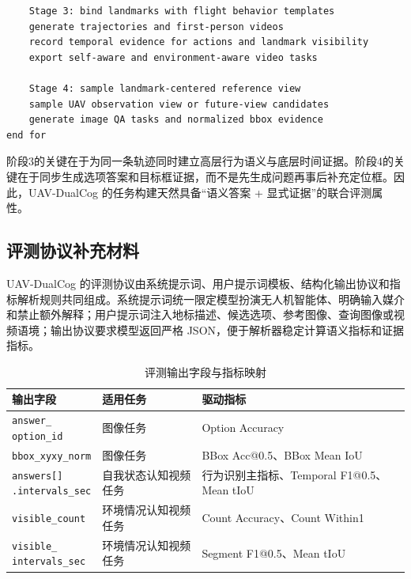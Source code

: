 \begin{thesisappendix}
\begin{verbatim}
    Stage 3: bind landmarks with flight behavior templates
    generate trajectories and first-person videos
    record temporal evidence for actions and landmark visibility
    export self-aware and environment-aware video tasks

    Stage 4: sample landmark-centered reference view
    sample UAV observation view or future-view candidates
    generate image QA tasks and normalized bbox evidence
end for
\end{verbatim}

阶段3的关键在于为同一条轨迹同时建立高层行为语义与底层时间证据。阶段4的关键在于同步生成选项答案和目标框证据，而不是先生成问题再事后补充定位框。因此，UAV-DualCog 的任务构建天然具备“语义答案 + 显式证据”的联合评测属性。
\end{thesisappendix}

\begin{thesisappendix}
\section{评测协议补充材料}
\label{app:evaluation-protocol}
\label{app:prompt-protocol}

UAV-DualCog 的评测协议由系统提示词、用户提示词模板、结构化输出协议和指标解析规则共同组成。系统提示词统一限定模型扮演无人机智能体、明确输入媒介和禁止额外解释；用户提示词注入地标描述、候选选项、参考图像、查询图像或视频语境；输出协议要求模型返回严格 JSON，便于解析器稳定计算语义指标和证据指标。

\begin{table}[htbp]
    \centering
    \caption{评测输出字段与指标映射}
    \label{tab:app-output-metric-map}
    \footnotesize
    \begin{tabularx}{\textwidth}{@{}p{3.0cm}p{3.4cm}X@{}}
        \toprule
        输出字段 & 适用任务 & 驱动指标 \\
        \midrule
        \makecell[l]{\texttt{answer\_}\\\texttt{option\_id}} & 图像任务 & Option Accuracy \\
        \texttt{bbox\_xyxy\_norm} & 图像任务 & BBox Acc@0.5、BBox Mean IoU \\
        \makecell[l]{\texttt{answers[]}\\\texttt{.intervals\_sec}} & 自我状态认知视频任务 & 行为识别主指标、Temporal F1@0.5、Mean tIoU \\
        \texttt{visible\_count} & 环境情况认知视频任务 & Count Accuracy、Count Within1 \\
        \makecell[l]{\texttt{visible\_}\\\texttt{intervals\_sec}} & 环境情况认知视频任务 & Segment F1@0.5、Mean tIoU \\
        \bottomrule
    \end{tabularx}
\end{table}


\end{thesisappendix}
